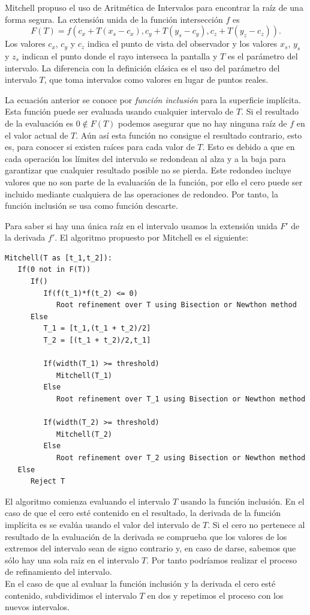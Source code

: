 Mitchell\cite{Mitchell90} propuso el uso de Aritmética de Intervalos para encontrar la raíz de una forma segura. La extensión unida de la función intersección $f$ es
\begin{equation}
F(T) = f(c_x + T(x_s - c_x), c_y + T(y_s - c_y), c_z + T(y_z - c_z)).
\nonumber
\end{equation}
Los valores $c_x$, $c_y$ y $c_z$ indica el punto de vista del observador y los valores $x_s$, $y_s$ y $z_s$ indican el punto donde el rayo interseca la pantalla y $T$ es el parámetro del intervalo. La diferencia con la definición clásica es el uso del parámetro del intervalo $T$, que toma intervalos como valores en lugar de puntos reales.

La ecuación anterior se conoce por{ \em función inclusión} para la superficie implícita. Esta función puede ser evaluada usando cualquier intervalo de $T$. Si el resultado de la evaluación es $0 \notin F(T)$ podemos asegurar que no hay ninguna raíz de $f$ en el valor actual de $T$. Aún así esta función no consigue el resultado contrario, esto es, para conocer si existen raíces para cada valor de $T$. Esto es debido a que en cada operación los límites del intervalo se redondean al alza y a la baja para garantizar que cualquier resultado posible no se pierda. Este redondeo incluye valores que no son parte de la evaluación de la función, por ello el cero puede ser incluido mediante cualquiera de las operaciones de redondeo. Por tanto, la función inclusión se usa como función descarte. 

Para saber si hay una única raíz en el intervalo usamos la extensión unida $F'$ de la derivada $f'$. El algoritmo propuesto por Mitchell es el siguiente:
\begin{verbatim}
Mitchell(T as [t_1,t_2]):
   If(0 not in F(T))
      If()
         If(f(t_1)*f(t_2) <= 0)
            Root refinement over T using Bisection or Newthon method
      Else
         T_1 = [t_1,(t_1 + t_2)/2]
         T_2 = [(t_1 + t_2)/2,t_1]
         
         If(width(T_1) >= threshold)
            Mitchell(T_1)
         Else
            Root refinement over T_1 using Bisection or Newthon method
         
         If(width(T_2) >= threshold)
            Mitchell(T_2)
         Else
            Root refinement over T_2 using Bisection or Newthon method
   Else
      Reject T
\end{verbatim}

El algoritmo comienza evaluando el intervalo $T$ usando la función inclusión. En el caso de que el cero esté contenido en el resultado, la derivada de la función implícita es se evalúa usando el valor del intervalo de $T$. Si el cero no pertenece al resultado de la evaluación de la derivada se comprueba que los valores de los extremos del intervalo sean de signo contrario y, en caso de darse, sabemos que sólo hay una sola raíz en el intervalo $T$. Por tanto podríamos realizar el proceso de refinamiento del intervalo.
\\En el caso de que al evaluar la función inclusión y la derivada el cero esté contenido, subdividimos el intervalo $T$ en dos y repetimos el proceso con los nuevos intervalos.

